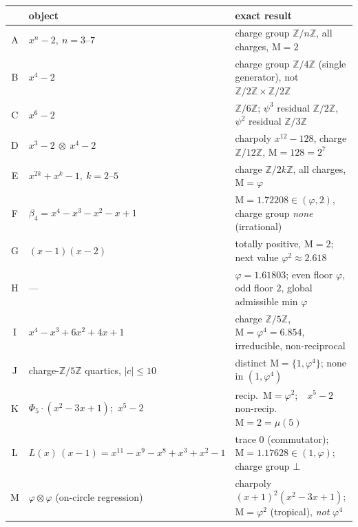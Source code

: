 \documentclass[11pt]{article}
\theoremstyle{definition}
\theoremstyle{remark}
\newcommand{\Mah}{\mathrm{M}}
\newcommand{\Z}{\mathbb{Z}}
\newcommand{\Adams}[1]{\psi^{#1}}
\newcommand{\gold}{\varphi}
\newcommand{\tens}{\otimes}
\newcommand{\Zmod}[1]{\Z/#1\Z}
\begin{document}
\begin{center}
\begin{tabular}{cll}
\toprule
& object & exact result \\
\midrule
A & $x^{n}-2,\ n=3\text{--}7$ & charge group $\Zmod n$, all charges, $\Mah=2$ \\
B & $x^{4}-2$ & charge group $\Zmod4$ (single generator), not $\Zmod2\times\Zmod2$ \\
C & $x^{6}-2$ & $\Zmod6$; $\Adams3$ residual $\Zmod2$, $\Adams2$ residual $\Zmod3$ \\
D & $x^{3}-2\ \tens\ x^{4}-2$ & charpoly $x^{12}-128$, charge $\Zmod{12}$, $\Mah=128=2^{7}$ \\
E & $x^{2k}+x^{k}-1,\ k=2\text{--}5$ & charge $\Zmod{2k}$, all charges, $\Mah=\gold$ \\
F & $\beta_4=x^4-x^3-x^2-x+1$ & $\Mah=1.72208\in(\gold,2)$, charge group \emph{none} (irrational) \\
G & $(x-1)(x-2)$ & totally positive, $\Mah=2$; next value $\gold^2\approx2.618$ \\
H & --- & $\gold=1.61803$; even floor $\gold$, odd floor $2$, global admissible min $\gold$ \\
\midrule
I & $x^4-x^3+6x^2+4x+1$ & charge $\Zmod5$, $\Mah=\gold^{4}=6.854$, irreducible, non-reciprocal \\
J & charge-$\Zmod5$ quartics, $|c|\le10$ & distinct $\Mah=\{1,\gold^{4}\}$; none in $(1,\gold^{4})$ \\
K & $\Phi_5\!\cdot\!(x^2-3x+1)$;\ $x^{5}-2$ & recip.\ $\Mah=\gold^{2}$;\ \ $x^{5}-2$ non-recip.\ $\Mah=2=\mu(5)$ \\
\midrule
L & $L(x)\,(x-1)=x^{11}-x^{9}-x^{8}+x^{3}+x^{2}-1$ & trace $0$ (commutator); $\Mah=1.17628\in(1,\gold)$; charge group $\bot$ \\
\midrule
M & $\gold\tens\gold$ (on-circle regression) & charpoly $(x{+}1)^2(x^2{-}3x{+}1)$; $\Mah=\gold^{2}$ (tropical), \emph{not} $\gold^{4}$ \\
\bottomrule
\end{tabular}
\end{center}
\end{document}
